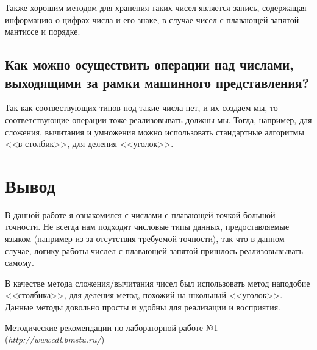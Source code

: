 \documentclass[a4paper,12pt]{extarticle}
\begin{document}
Также хорошим методом для хранения таких чисел является запись, содержащая информацию о цифрах числа и его знаке, в случае чисел с плавающей запятой --- мантиссе и порядке.

\subsection{Как  можно  осуществить  операции  над  числами,  выходящими  за рамки машинного представления?}
Так как соотвествующих типов под такие числа нет, и их создаем мы, то соответствующие операции тоже реализовывать должны мы. Тогда, например, для сложения, вычитания и умножения можно использовать стандартные алгоритмы <<в столбик>>, для деления <<уголок>>.


\newpage

\section{Вывод}
В данной работе я ознакомился с числами с плавающей точкой большой точности. Не всегда нам подходят числовые типы данных, предоставляемые языком (например из-за отсутствия требуемой точности), так что в данном случае, логику работы числел с плавающей запятой пришлось реализовывывать самому. 

В качестве метода сложения/вычитания чисел был использовать метод наподобие <<столбика>>, для деления метод, похожий на школьный <<уголок>>. Данные методы довольно просты и удобны для реализации и восприятия.

\newpage
\begin{thebibliography}{2}
Методические рекомендации по лабораторной работе №1 (\emph{http://wwwcdl.bmstu.ru/}) 
\end{thebibliography}
\end{document}
